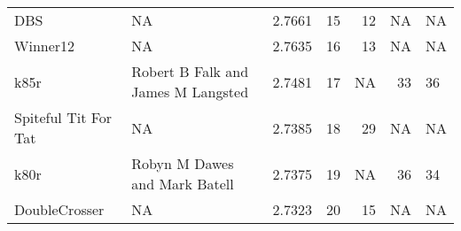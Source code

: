 \begin{tabular}{llrrrrl}
DBS                        &                                  NA &  2.7661 &    15 &            12 &             NA &              NA \\
Winner12                   &                                  NA &  2.7635 &    16 &            13 &             NA &              NA \\
k85r                       &  Robert B Falk and James M Langsted &  2.7481 &    17 &            NA &             33 &              36 \\
Spiteful Tit For Tat       &                                  NA &  2.7385 &    18 &            29 &             NA &              NA \\
k80r                       &       Robyn M Dawes and Mark Batell &  2.7375 &    19 &            NA &             36 &              34 \\
DoubleCrosser              &                                  NA &  2.7323 &    20 &            15 &             NA &              NA \\
\bottomrule
\end{tabular}
